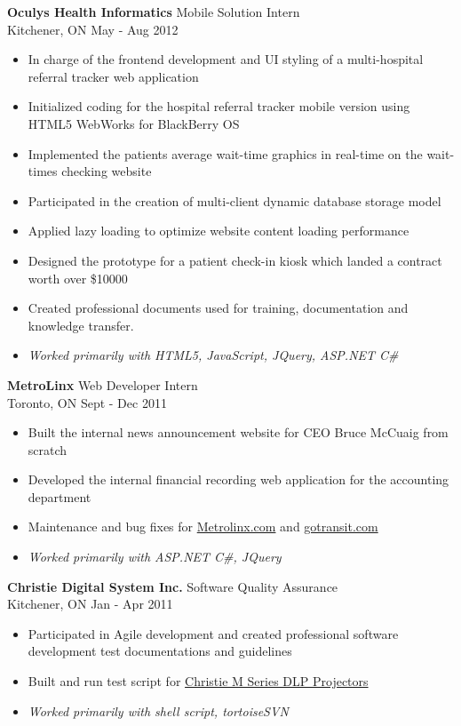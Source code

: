 \documentclass[line,margin]{res}
\begin{document}
\begin{resume}
{\bf Oculys Health Informatics} \hfill Mobile Solution Intern \\
Kitchener, ON \hfill May - Aug 2012
\begin{itemize}
\item In charge of the frontend development and UI styling of a multi-hospital referral tracker web application
\item Initialized coding for the hospital referral tracker mobile version using HTML5 WebWorks for BlackBerry OS
\item Implemented the patients average wait-time graphics in real-time on the wait-times checking website
\item Participated in the creation of multi-client dynamic database storage model
\item Applied lazy loading to optimize website content loading performance
\item Designed the prototype for a patient check-in kiosk which landed a contract worth over \$10000
\item Created professional documents used for training, documentation and knowledge transfer.
\item {\it Worked primarily with HTML5, JavaScript, JQuery, ASP.NET C\#}
\end{itemize}

{\bf MetroLinx} \hfill Web Developer Intern \\
Toronto, ON \hfill Sept - Dec 2011
\begin{itemize}
\item Built the internal news announcement website for CEO Bruce McCuaig from scratch
\item Developed the internal financial recording web application for the accounting department
\item Maintenance and bug fixes for \href{http://metrolinx.com/en/}{Metrolinx.com} and \href{http://gotransit.com/publicroot/en/default.aspx}{gotransit.com}
\item {\it Worked primarily with ASP.NET C\#, JQuery}
\end{itemize}

{\bf Christie Digital System Inc.} \hfill Software Quality Assurance \\
Kitchener, ON \hfill Jan - Apr 2011
\begin{itemize}
\item Participated in Agile development and created professional software development test documentations and guidelines
\item Built and run test script for \href{http://www.christiedigital.com/en-us/business/products/projectors/3-chip-dlp/m-series/pages/default.aspx}{Christie M Series DLP Projectors}
\item {\it Worked primarily with shell script, tortoiseSVN}
\end{itemize}


\end{resume}
\end{document}
